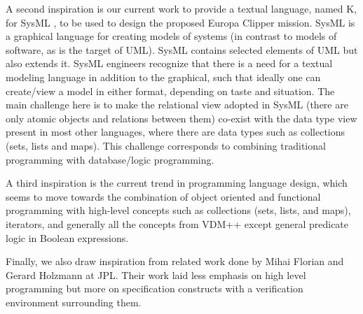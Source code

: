 \documentclass{llncs}
\begin{document}
A second inspiration is our current work to provide a textual
language, named K, for SysML , to be used to design the proposed
Europa Clipper mission. SysML is a graphical language for creating
models of systems (in contrast to models of software, as is the target
of UML). SysML contains selected elements of UML but also extends
it. SysML engineers recognize that there is a need for a textual
modeling language in addition to the graphical, such that ideally one
can create/view a model in either format, depending on taste and
situation. The main challenge here is to make the relational view
adopted in SysML (there are only atomic objects and relations between
them) co-exist with the data type view present in most other
languages, where there are data types such as collections (sets, lists
and maps). This challenge corresponds to combining traditional
programming with database/logic programming.

\begin{comment}
As it turns out, the SysML team at JPL has asked for a textual
language very much along the lines of VDM and Z. This in itself is
interesting: that the SysML/UML community sees a need for the kind of
languages that formal methods came up with decades ago. 
\end{comment}

A third inspiration is the current trend in programming language
design, which seems to move towards the combination of object oriented
and functional programming with high-level concepts such as
collections (sets, lists, and maps), iterators, and generally all the
concepts from VDM++ except general predicate logic in Boolean
expressions. 

Finally, we also draw inspiration from related work done by Mihai
Florian and Gerard Holzmann at JPL. Their work laid less emphasis on
high level programming but more on specification constructs with a
verification environment surrounding them.

\begin{comment}
There has also been programming languages in the past, such as SETL,
which focused on set theory, also an inspiration.

Finally, the work of Mihai Florian guided by Gerard Holzmann was in
this line, although there was less emphasis on high-level
programming. The focus was exactly to design a programming language
with specification constructs, and with a verification environment
around it. Similar attempts are made with languages such as Spec\# and
Dafny from MSR. One might also mention the work on SPOT here at JPL,
and perhaps even unite with that work.

All in all, attempts have been made are being made in this
direction. Yet, it is an interesting avenue of research that we should
take on. 
\end{comment}
\end{document}
